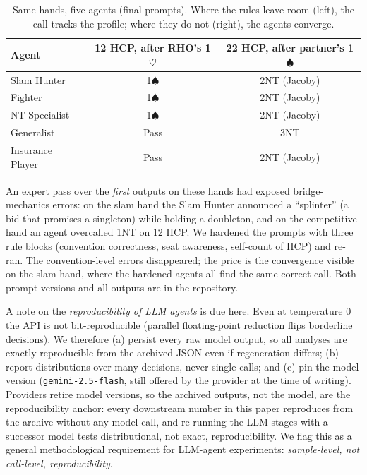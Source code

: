 \documentclass[runningheads]{llncs}
\begin{document}
\begin{table}[h]
\centering\small
\caption{Same hands, five agents (final prompts). Where the rules
leave room (left), the call tracks the profile; where they do not
(right), the agents converge.}
\label{tab:samehand}
\begin{tabular}{lcc}
\toprule
Agent & 12 HCP, after RHO's 1$\heartsuit$ & 22 HCP, after partner's 1$\spadesuit$\\
\midrule
Slam Hunter      & 1$\spadesuit$ & 2NT (Jacoby)\\
Fighter          & 1$\spadesuit$ & 2NT (Jacoby)\\
NT Specialist    & 1$\spadesuit$ & 2NT (Jacoby)\\
Generalist       & Pass          & 3NT\\
Insurance Player & Pass          & 2NT (Jacoby)\\
\bottomrule
\end{tabular}
\end{table}

An expert pass over the \emph{first} outputs on these hands had
exposed bridge-mechanics errors: on the slam hand the Slam Hunter
announced a ``splinter'' (a bid that promises a singleton) while
holding a doubleton, and on the competitive hand an agent overcalled
1NT on 12 HCP. We hardened the prompts with three rule blocks
(convention correctness, seat awareness, self-count of HCP) and
re-ran. The convention-level errors disappeared; the price is the
convergence visible on the slam hand, where the hardened agents all
find the same correct call. Both prompt versions and all outputs are
in the repository.

A note on the \emph{reproducibility of LLM agents} is due here. Even at
temperature 0 the
API is not bit-reproducible (parallel floating-point reduction flips
borderline decisions). We therefore (a) persist every raw model output,
so all analyses are exactly reproducible from the archived JSON even if
regeneration differs; (b) report distributions over many decisions,
never single calls; and (c) pin the model version
(\texttt{gemini-2.5-flash}, still offered by the provider at the time
of writing). Providers retire model versions, so the archived outputs,
not the model, are the reproducibility anchor: every downstream number
in this paper reproduces from the archive without any model call, and
re-running the LLM stages with a successor model tests
distributional, not exact, reproducibility. We flag this as a general
methodological requirement for LLM-agent experiments:
\emph{sample-level, not call-level, reproducibility}.
\end{document}
